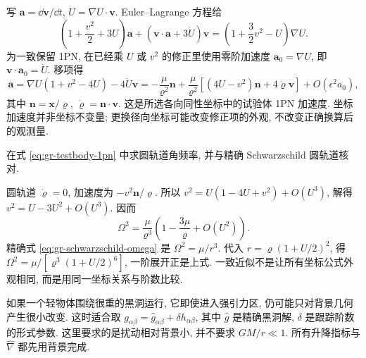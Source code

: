 写 $\boldsymbol a=\dd\boldsymbol v/\dd t$, $\dot U=\nabla U\cdot\boldsymbol v$. Euler--Lagrange 方程给
\[
 \left(1+\frac{v^2}2+3U\right)\boldsymbol a
       +(\boldsymbol v\cdot\boldsymbol a+3\dot U)\boldsymbol v
   =\left(1+\frac32v^2-U\right)\nabla U.
\]
为一致保留 1PN, 在已经乘 $U$ 或 $v^2$ 的修正里使用零阶加速度 $\boldsymbol a_0=\nabla U$, 即 $\boldsymbol v\cdot\boldsymbol a_0=\dot U$. 移项得
\begin{equation}
 \boldsymbol a=\nabla U(1+v^2-4U)-4\dot U\boldsymbol v
 =-\frac\mu{\varrho^2}\boldsymbol n
  +\frac\mu{\varrho^2}\left[
      (4U-v^2)\boldsymbol n+4\dot\varrho\boldsymbol v\right]
       +O(\epsilon^2 a_0),
 \label{eq:gr-testbody-1pn}
\end{equation}
其中 $\boldsymbol n=\boldsymbol x/\varrho$, $\dot\varrho=\boldsymbol n\cdot\boldsymbol v$. 这是所选各向同性坐标中的试验体 1PN 加速度. 坐标加速度并非坐标不变量; 更换径向坐标可能改变修正项的外观, 不改变正确换算后的观测量.

\begin{example}
 在式 \eqref{eq:gr-testbody-1pn} 中求圆轨道角频率, 并与精确 Schwarzschild 圆轨道核对.
\end{example}
\begin{solution}
 圆轨道 $\dot\varrho=0$, 加速度为 $-v^2\boldsymbol n/\varrho$. 所以 $v^2=U(1-4U+v^2)+O(U^3)$, 解得 $v^2=U-3U^2+O(U^3)$. 因而
 \[
 \Omega^2=\frac\mu{\varrho^3}\left(1-\frac{3\mu}{\varrho}+O(U^2)\right).
 \]
 精确式 \eqref{eq:gr-schwarzschild-omega} 是 $\Omega^2=\mu/r^3$. 代入 $r=\varrho(1+U/2)^2$, 得 $\Omega^2=\mu/[\varrho^3(1+U/2)^6]$, 一阶展开正是上式. 一致近似不是让所有坐标公式外观相同, 而是用同一坐标关系与阶数比较.
\end{solution}


如果一个轻物体围绕很重的黑洞运行, 它即使进入强引力区, 仍可能只对背景几何产生很小改变. 这时适合取 $g_{\alpha\beta}=\widehat g_{\alpha\beta}+\delta h_{\alpha\beta}$, 其中 $\widehat g$ 是精确黑洞解, $\delta$ 是跟踪阶数的形式参数. 这里要求的是扰动相对背景小, 并不要求 $GM/r\ll1$. 所有升降指标与 $\widehat\nabla$ 都先用背景完成.

